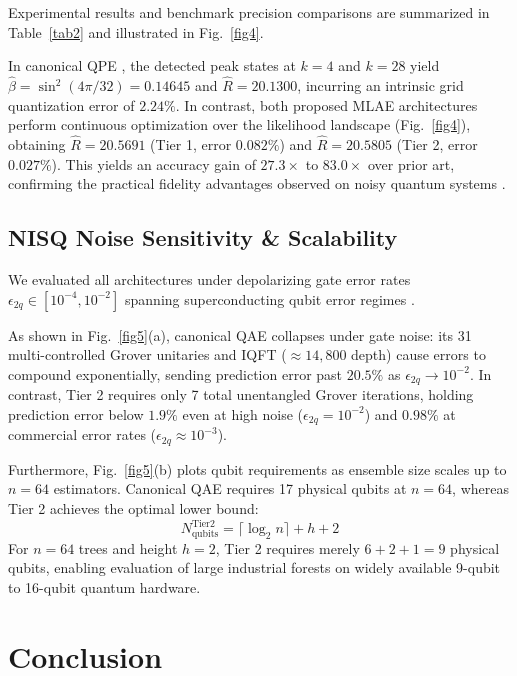 \documentclass[conference]{IEEEtran}
\begin{document}
Experimental results and benchmark precision comparisons are summarized in Table~\ref{tab2} and illustrated in Fig.~\ref{fig4}.

In canonical QPE \cite{khadiev2026quantum}, the detected peak states at $k = 4$ and $k = 28$ yield $\hat{\beta} = \sin^2(4\pi/32) = 0.14645$ and $\hat{R} = 20.1300$, incurring an intrinsic grid quantization error of $2.24\%$. In contrast, both proposed MLAE architectures perform continuous optimization over the likelihood landscape (Fig.~\ref{fig4}), obtaining $\hat{R} = 20.5691$ (Tier 1, error $0.082\%$) and $\hat{R} = 20.5805$ (Tier 2, error $0.027\%$). This yields an accuracy gain of $27.3\times$ to $83.0\times$ over prior art, confirming the practical fidelity advantages observed on noisy quantum systems \cite{tanaka2022amplitude}.

\subsection{NISQ Noise Sensitivity \& Scalability}\label{subsec6.3}

We evaluated all architectures under depolarizing gate error rates $\epsilon_{2q} \in [10^{-4}, 10^{-2}]$ spanning superconducting qubit error regimes \cite{preskill2018quantum}.

As shown in Fig.~\ref{fig5}(a), canonical QAE collapses under gate noise: its 31 multi-controlled Grover unitaries and IQFT ($\approx 14,800$ depth) cause errors to compound exponentially, sending prediction error past $20.5\%$ as $\epsilon_{2q} \to 10^{-2}$. In contrast, Tier 2 requires only 7 total unentangled Grover iterations, holding prediction error below $1.9\%$ even at high noise ($\epsilon_{2q} = 10^{-2}$) and $0.98\%$ at commercial error rates ($\epsilon_{2q} \approx 10^{-3}$).

Furthermore, Fig.~\ref{fig5}(b) plots qubit requirements as ensemble size scales up to $n = 64$ estimators. Canonical QAE requires 17 physical qubits at $n = 64$, whereas Tier 2 achieves the optimal lower bound:
\begin{equation}\label{eq16}
N_{\mathrm{qubits}}^{\mathrm{Tier 2}} = \lceil\log_2 n\rceil + h + 2
\end{equation}
For $n = 64$ trees and height $h = 2$, Tier 2 requires merely $6 + 2 + 1 = 9$ physical qubits, enabling evaluation of large industrial forests on widely available 9-qubit to 16-qubit quantum hardware.

\section{Conclusion}\label{sec7}
\end{document}
